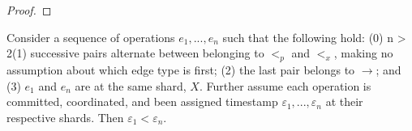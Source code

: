 \begin{proof}


\end{proof}

\begin{lem}
\label{lemma3}
Consider a sequence of operations $e_1,...,e_n$ such that the following hold: (0) n > 2(1) successive pairs alternate between belonging to $<_p$ and $<_x$, making no assumption about which edge type is first; (2) the last pair belongs to $\rightarrow$; and (3) $e_1$ and $e_n$ are at the same shard, $X$. Further assume each operation is committed, coordinated, and been assigned timestamp $\varepsilon_1, ..., \varepsilon_n$ at their respective shards. Then $\varepsilon_1 < \varepsilon_n$.
\end{lem}

